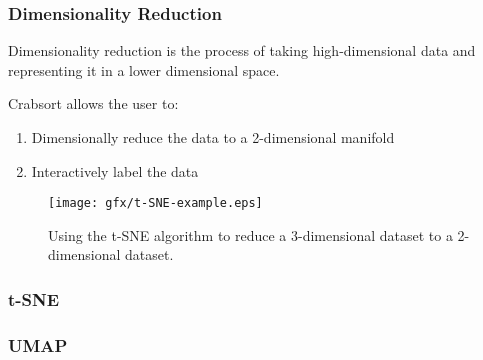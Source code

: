 \documentclass{beamer}
\begin{document}
\begin{frame}
  \frametitle{Dimensionality Reduction}

  Dimensionality reduction is the process of taking high-dimensional data
  and representing it in a lower dimensional space.

  Crabsort allows the user to:

  \begin{enumerate}
    \item Dimensionally reduce the data to a 2-dimensional manifold
    \item Interactively label the data
  \end{enumerate}

  \begin{figure}
    \texttt{[image: gfx/t-SNE-example.eps]}
    \centering
    \caption{Using the t-SNE algorithm to reduce a 3-dimensional dataset to a 2-dimensional dataset.}
    \label{fig:dimredexample}
  \end{figure}


\end{frame}


\begin{frame}
  \frametitle{t-SNE}
\end{frame}


\begin{frame}
  \frametitle{UMAP}
\end{frame}
\end{document}
